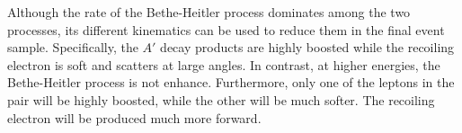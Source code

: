 Although the rate of the Bethe-Heitler process dominates among the two processes, 
its different kinematics can be used to reduce them in the final event sample.
Specifically, the $A'$ decay products are highly boosted while the recoiling 
electron is soft and scatters at large angles.  In contrast, at higher 
energies, the Bethe-Heitler process is not enhance.  Furthermore, only one of
the leptons in the pair will be highly boosted, while the other will be much
softer.  The recoiling electron will be produced much more forward.


